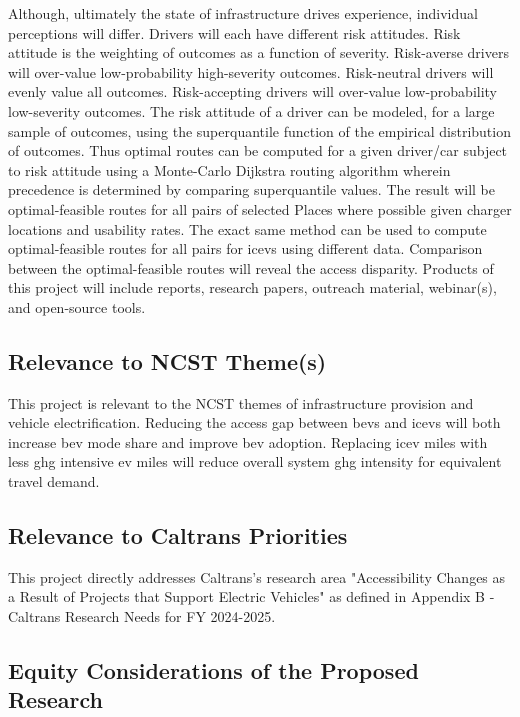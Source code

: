 \documentclass[12pt]{article}
\begin{document}
Although, ultimately the state of infrastructure drives experience, individual perceptions will differ. Drivers will each have different risk attitudes. Risk attitude is the weighting of outcomes as a function of severity. Risk-averse drivers will over-value low-probability high-severity outcomes. Risk-neutral drivers will evenly value all outcomes. Risk-accepting drivers will over-value low-probability low-severity outcomes. The risk attitude of a driver can be modeled, for a large sample of outcomes, using the superquantile function of the empirical distribution of outcomes. Thus optimal routes can be computed for a given driver/car subject to risk attitude using a Monte-Carlo Dijkstra routing algorithm wherein precedence is determined by comparing superquantile values. The result will be optimal-feasible routes for all pairs of selected Places where possible given charger locations and usability rates. The exact same method can be used to compute optimal-feasible routes for all pairs for \glspl{icev} using different data. Comparison between the optimal-feasible routes will reveal the access disparity. Products of this project will include reports, research papers, outreach material, webinar(s), and open-source tools.

\subsection*{Relevance to NCST Theme(s)}

This project is relevant to the NCST themes of infrastructure provision and vehicle electrification. Reducing the access gap between \glspl{bev} and \glspl{icev} will both increase \gls{bev} mode share and improve \gls{bev} adoption. Replacing \gls{icev} miles with less \gls{ghg} intensive \gls{ev} miles will reduce overall system \gls{ghg} intensity for equivalent travel demand.

\subsection*{Relevance to Caltrans Priorities}

This project directly addresses Caltrans's research area "Accessibility Changes as a Result of Projects that Support Electric Vehicles" as defined in Appendix B - Caltrans Research Needs for FY 2024-2025.

\subsection*{Equity Considerations of the Proposed Research}
\end{document}
